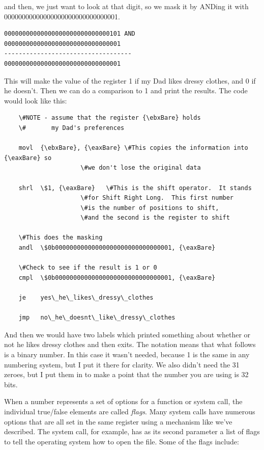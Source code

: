 and then, we just want to look at that digit, so we mask it by ANDing
it with 00000000000000000000000000000001.

\begin{simpletyping}
\begin{lstlisting}
00000000000000000000000000000101 AND
00000000000000000000000000000001
-----------------------------------
00000000000000000000000000000001
\end{lstlisting}
\end{simpletyping}

This will make the value of the register 1 if my Dad likes dressy
clothes, and 0 if he doesn't.  Then we can do a comparison to 1
and print the results.  The code would look like this:

\begin{simpletyping}
\begin{lstlisting}
	\#NOTE - assume that the register {\ebxBare} holds 
	\#       my Dad's preferences

	movl  {\ebxBare}, {\eaxBare} \#This copies the information into {\eaxBare} so
	                 \#we don't lose the original data

	shrl  \$1, {\eaxBare}   \#This is the shift operator.  It stands
	                 \#for Shift Right Long.  This first number
	                 \#is the number of positions to shift,
	                 \#and the second is the register to shift
	
	\#This does the masking
	andl  \$0b00000000000000000000000000000001, {\eaxBare} 

	\#Check to see if the result is 1 or 0
	cmpl  \$0b00000000000000000000000000000001, {\eaxBare} 

	je    yes\_he\_likes\_dressy\_clothes

	jmp   no\_he\_doesnt\_like\_dressy\_clothes
\end{lstlisting}
\end{simpletyping}

And then we would have two labels which printed something about
whether or not he likes dressy clothes and then exits.
The  notation means that what follows is a binary number.  
In this case it wasn't needed, because 1 is the same in any
numbering system, but I put it there for clarity.  
We also didn't need the 31 zeroes, but I put them in
to make a point that the number you are using is 32 bits.

When a number represents a set of options for a function or system call,
the individual true/false elements are called \emph{flags}.
Many system calls have numerous options that are all
set in the same register using a mechanism like we've described.
The  system call, for example, has as its
second parameter a list of flags to tell the operating system how
to open the file.  Some of the flags include:

